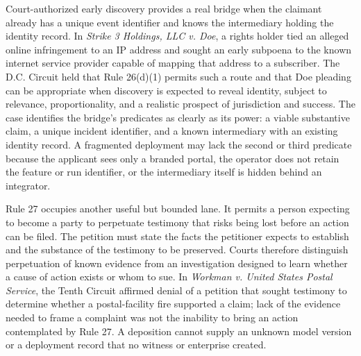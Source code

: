Court-authorized early discovery provides a real bridge when the claimant already has a unique event identifier and knows the intermediary holding the identity record. In \emph{Strike 3 Holdings, LLC v. Doe}, a rights holder tied an alleged online infringement to an IP address and sought an early subpoena to the known internet service provider capable of mapping that address to a subscriber. The D.C. Circuit held that Rule 26(d)(1) permits such a route and that Doe pleading can be appropriate when discovery is expected to reveal identity, subject to relevance, proportionality, and a realistic prospect of jurisdiction and success. The case identifies the bridge's predicates as clearly as its power: a viable substantive claim, a unique incident identifier, and a known intermediary with an existing identity record. A fragmented deployment may lack the second or third predicate because the applicant sees only a branded portal, the operator does not retain the feature or run identifier, or the intermediary itself is hidden behind an integrator.

Rule 27 occupies another useful but bounded lane. It permits a person expecting to become a party to perpetuate testimony that risks being lost before an action can be filed. The petition must state the facts the petitioner expects to establish and the substance of the testimony to be preserved. Courts therefore distinguish perpetuation of known evidence from an investigation designed to learn whether a cause of action exists or whom to sue. In \emph{Workman v. United States Postal Service}, the Tenth Circuit affirmed denial of a petition that sought testimony to determine whether a postal-facility fire supported a claim; lack of the evidence needed to frame a complaint was not the inability to bring an action contemplated by Rule 27. A deposition cannot supply an unknown model version or a deployment record that no witness or enterprise created.

